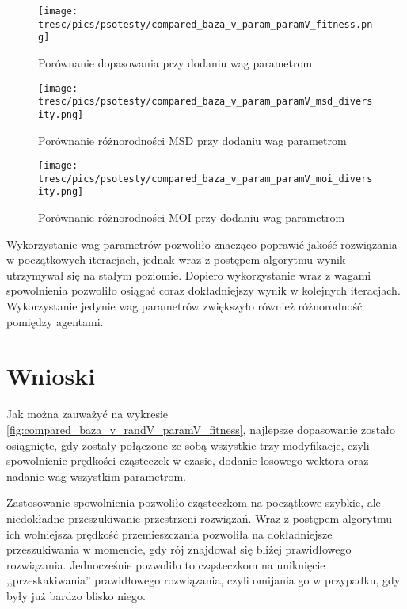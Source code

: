 \clearpage

\begin{figure}[H]
\begin{center} 
\texttt{[image: tresc/pics/psotesty/compared\_baza\_v\_param\_paramV\_fitness.png]}
\caption{Porównanie dopasowania przy dodaniu wag parametrom}
\label{fig:compared_baza_v_param_paramV_fitness}
\end{center}
\end{figure}

\begin{figure}[H]
\begin{center} 
\texttt{[image: tresc/pics/psotesty/compared\_baza\_v\_param\_paramV\_msd\_diversity.png]}
\caption{Porównanie różnorodności MSD przy dodaniu wag parametrom}
\label{fig:compared_baza_v_param_paramV_msd_diversity}
\end{center}
\end{figure}

\begin{figure}[H]
\begin{center} 
\texttt{[image: tresc/pics/psotesty/compared\_baza\_v\_param\_paramV\_moi\_diversity.png]}
\caption{Porównanie różnorodności MOI przy dodaniu wag parametrom}
\label{fig:compared_baza_v_param_paramV_moi_diversity}
\end{center}
\end{figure}

Wykorzystanie wag parametrów pozwoliło znacząco poprawić jakość rozwiązania w początkowych iteracjach, jednak wraz z postępem algorytmu wynik utrzymywał się na stałym poziomie. Dopiero wykorzystanie wraz z wagami spowolnienia pozwoliło osiągać coraz dokładniejszy wynik w kolejnych iteracjach. Wykorzystanie jedynie wag parametrów zwiększyło również różnorodność pomiędzy agentami.

\section{Wnioski}
Jak można zauważyć na wykresie \ref{fig:compared_baza_v_randV_paramV_fitness}, najlepsze dopasowanie zostało osiągnięte, gdy zostały połączone ze sobą wszystkie trzy modyfikacje, czyli spowolnienie prędkości cząsteczek w czasie, dodanie losowego wektora oraz nadanie wag wszystkim parametrom. 

Zastosowanie spowolnienia pozwoliło cząsteczkom na początkowe szybkie, ale niedokładne przeszukiwanie przestrzeni rozwiązań. Wraz z postępem algorytmu ich wolniejsza prędkość przemieszczania pozwoliła na dokładniejsze przeszukiwania w momencie, gdy rój znajdował się bliżej prawidłowego rozwiązania. Jednocześnie pozwoliło to cząsteczkom na uniknięcie ,,przeskakiwania'' prawidłowego rozwiązania, czyli omijania go w przypadku, gdy były już bardzo blisko niego.


